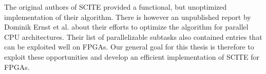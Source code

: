 The original authors of \ac{SCITE} provided a functional, but unoptimized implementation of their algorithm. There is however an unpublished report by Dominik Ernst et al. \cite{ernst2020Performance} about their efforts to optimize the algorithm for parallel CPU architectures. Their list of parallelizable subtasks also contained entries that can be exploited well on \acp{FPGA}. Our general goal for this thesis is therefore to exploit these opportunities and develop an efficient implementation of \ac{SCITE} for \acp{FPGA}. 



